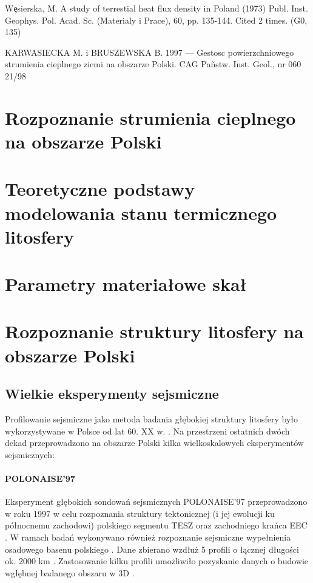\documentclass[11.5pt,twoside]{report}
\newcommand{\ct}[1]{\ignorespaces} %
\begin{document}
Wȩsierska, M.
A study of terrestial heat flux density in Poland
(1973) Publ. Inst. Geophys. Pol. Acad. Sc. (Materialy i Prace), 60, pp. 135-144. Cited 2 times. (G0, 135)

KARWASIECKA M. i BRUSZEWSKA B. 1997 — Gestosc
powierzchniowego strumienia cieplnego ziemi na obszarze Polski.
CAG Pañstw. Inst. Geol., nr 060 21/98
\fi

\chapter{Rozpoznanie strumienia cieplnego na obszarze Polski}

\chapter{Teoretyczne podstawy modelowania stanu termicznego litosfery}


\chapter{Parametry materiałowe skał}


\chapter{Rozpoznanie struktury litosfery na obszarze Polski}

\section{Wielkie eksperymenty sejsmiczne}

Profilowanie sejsmiczne jako metoda badania głębokiej struktury litosfery było wykorzystywane w Polsce od lat 60. XX w. \ct{zrodlo}. Na przestrzeni ostatnich dwóch dekad przeprowadzono na obszarze Polski kilka wielkoskalowych eksperymentów sejsmicznych:

\subsubsection{POLONAISE'97}
Eksperyment głębokich sondowań sejsmicznych POLONAISE'97 przeprowadzono w roku 1997 w celu rozpoznania struktury tektonicznej (i jej ewolucji ku północnemu zachodowi) polskiego segmentu TESZ oraz zachodniego krańca EEC \parencite{GrupaRoboczaPOLONAISE.2002}. W ramach badań wykonywano również rozpoznanie sejsmiczne wypełnienia osadowego basenu polskiego \parencite{GrupaRoboczaPOLONAISE.2002}. Dane zbierano wzdłuż 5 profili o łącznej długości ok. 2000 km \parencite{GrupaRoboczaPOLONAISE.2002}. Zastosowanie kilku profili umożliwiło pozyskanie danych o budowie wgłębnej badanego obszaru w 3D \parencite{Guterch.1998}.
\end{document}

